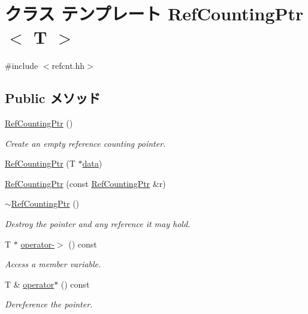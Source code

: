 \hypertarget{classRefCountingPtr}{
\section{クラス テンプレート RefCountingPtr$<$ T $>$}
\label{classRefCountingPtr}
}


{\ttfamily \#include $<$refcnt.hh$>$}\subsection*{Public メソッド}
\begin{DoxyCompactItemize}
\item 
\hyperlink{classRefCountingPtr_a36626d973a3bfce9ea3deda94b2fafe0}{RefCountingPtr} ()
\begin{DoxyCompactList}\small\item\em Create an empty reference counting pointer. \item\end{DoxyCompactList}\item 
\hyperlink{classRefCountingPtr_ab36d4c5bc63188c9877bf4d552ea8071}{RefCountingPtr} (T $\ast$\hyperlink{classRefCountingPtr_ac88dceffbecaed1137b0e27783adbcc5}{data})
\item 
\hyperlink{classRefCountingPtr_a9049efc00f5d3c7a115a6d2e0fcec09c}{RefCountingPtr} (const \hyperlink{classRefCountingPtr}{RefCountingPtr} \&r)
\item 
\hyperlink{classRefCountingPtr_a4ebce3855f9a62d273930390acdbde50}{$\sim$RefCountingPtr} ()
\begin{DoxyCompactList}\small\item\em Destroy the pointer and any reference it may hold. \item\end{DoxyCompactList}\item 
T $\ast$ \hyperlink{classRefCountingPtr_ac0ddd007dfcfef3121f74d0665dfd0cd}{operator-\/$>$} () const 
\begin{DoxyCompactList}\small\item\em Access a member variable. \item\end{DoxyCompactList}\item 
T \& \hyperlink{classRefCountingPtr_abcc36ef133f26e7e3145b785df23eb18}{operator$\ast$} () const 
\begin{DoxyCompactList}\small\item\em Dereference the pointer. \item\end{DoxyCompactList}\item 

\end{DoxyCompactItemize}
